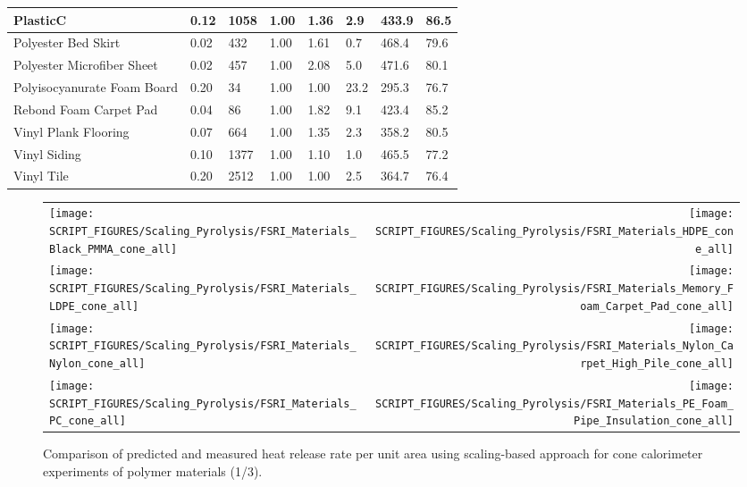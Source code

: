 \begin{table}[!h]
\begin{tabular}{|p{5.5cm}|p{1.0cm}|p{1.0cm}|p{0.8cm}|p{1.4cm}|p{1.0cm}|p{1.0cm}|p{1.2cm}|}
PlasticC & 0.12 & 1058 & 1.00 & 1.36 & 2.9 & 433.9 & 86.5 \\ \hline
Polyester Bed Skirt & 0.02 & 432 & 1.00 & 1.61 & 0.7 & 468.4 & 79.6 \\ \hline
Polyester Microfiber Sheet & 0.02 & 457 & 1.00 & 2.08 & 5.0 & 471.6 & 80.1 \\ \hline
Polyisocyanurate Foam Board & 0.20 & 34 & 1.00 & 1.00 & 23.2 & 295.3 & 76.7 \\ \hline
Rebond Foam Carpet Pad & 0.04 & 86 & 1.00 & 1.82 & 9.1 & 423.4 & 85.2 \\ \hline
Vinyl Plank Flooring & 0.07 & 664 & 1.00 & 1.35 & 2.3 & 358.2 & 80.5 \\ \hline
Vinyl Siding & 0.10 & 1377 & 1.00 & 1.10 & 1.0 & 465.5 & 77.2 \\ \hline
Vinyl Tile & 0.20 & 2512 & 1.00 & 1.00 & 2.5 & 364.7 & 76.4 \\ \hline
\end{tabular}
\label{Properties_FSRI_NIJ_Materials_polymers}
\end{table}

\begin{figure}[p]
\begin{tabular*}{\textwidth}{l@{\extracolsep{\fill}}r}
\texttt{[image: SCRIPT\_FIGURES/Scaling\_Pyrolysis/FSRI\_Materials\_Black\_PMMA\_cone\_all]} &
\texttt{[image: SCRIPT\_FIGURES/Scaling\_Pyrolysis/FSRI\_Materials\_HDPE\_cone\_all]} \\
\texttt{[image: SCRIPT\_FIGURES/Scaling\_Pyrolysis/FSRI\_Materials\_LDPE\_cone\_all]} &
\texttt{[image: SCRIPT\_FIGURES/Scaling\_Pyrolysis/FSRI\_Materials\_Memory\_Foam\_Carpet\_Pad\_cone\_all]} \\
\texttt{[image: SCRIPT\_FIGURES/Scaling\_Pyrolysis/FSRI\_Materials\_Nylon\_cone\_all]} &
\texttt{[image: SCRIPT\_FIGURES/Scaling\_Pyrolysis/FSRI\_Materials\_Nylon\_Carpet\_High\_Pile\_cone\_all]} \\
\texttt{[image: SCRIPT\_FIGURES/Scaling\_Pyrolysis/FSRI\_Materials\_PC\_cone\_all]} &
\texttt{[image: SCRIPT\_FIGURES/Scaling\_Pyrolysis/FSRI\_Materials\_PE\_Foam\_Pipe\_Insulation\_cone\_all]} \\
\end{tabular*}
\caption[HRRPUA of FSRI materials using scaling model, polymer materials]
{Comparison of predicted and measured heat release rate per unit area using scaling-based approach for cone calorimeter experiments of polymer materials (1/3).}
\label{FSRI_Materials_polymers1}
\end{figure}


